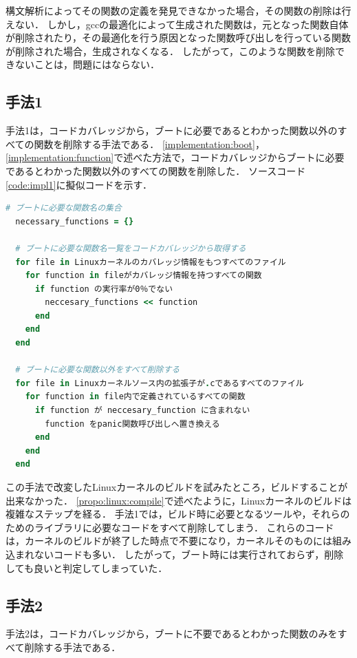 \documentclass[graduation-thesis]{mlarticle}
\begin{document}
構文解析によってその関数の定義を発見できなかった場合，その関数の削除は行えない．
しかし，gccの最適化によって生成された関数は，元となった関数自体が削除されたり，その最適化を行う原因となった関数呼び出しを行っている関数が削除された場合，生成されなくなる．
したがって，このような関数を削除できないことは，問題にはならない．

\subsection{手法1}
\label{implementation:1}

手法1は，コードカバレッジから，ブートに必要であるとわかった関数以外のすべての関数を削除する手法である．
\ref{implementation:boot}，\ref{implementation:function}で述べた方法で，コードカバレッジからブートに必要であるとわかった関数以外のすべての関数を削除した．
ソースコード\ref{code:impl1}に擬似コードを示す．

\begin{lstlisting}[language=ruby, caption=手法1の擬似コード, label=code:impl1]
  # ブートに必要な関数名の集合
  necessary_functions = {}

  # ブートに必要な関数名一覧をコードカバレッジから取得する
  for file in Linuxカーネルのカバレッジ情報をもつすべてのファイル
    for function in fileがカバレッジ情報を持つすべての関数
      if function の実行率が0％でない
        neccesary_functions << function
      end
    end
  end

  # ブートに必要な関数以外をすべて削除する
  for file in Linuxカーネルソース内の拡張子が.cであるすべてのファイル
    for function in file内で定義されているすべての関数 
      if function が neccesary_function に含まれない
        function をpanic関数呼び出しへ置き換える
      end
    end
  end
\end{lstlisting}

この手法で改変したLinuxカーネルのビルドを試みたところ，ビルドすることが出来なかった．
\ref{propo:linux:compile}で述べたように，Linuxカーネルのビルドは複雑なステップを経る．
手法1では，ビルド時に必要となるツールや，それらのためのライブラリに必要なコードをすべて削除してしまう．
これらのコードは，カーネルのビルドが終了した時点で不要になり，カーネルそのものには組み込まれないコードも多い．
したがって，ブート時には実行されておらず，削除しても良いと判定してしまっていた．



\subsection{手法2}
\label{implementation:2}
手法2は，コードカバレッジから，ブートに不要であるとわかった関数のみをすべて削除する手法である．
\end{document}
